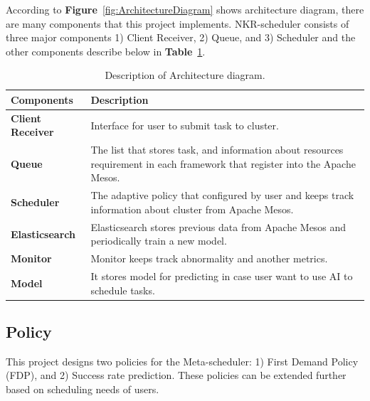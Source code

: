 \documentclass[12pt,oneside,openright,a4paper]{cpe-english-project}
\begin{document}
\hspace{10mm}According to \textbf{Figure}~\ref{fig:ArchitectureDiagram} shows architecture diagram, there are many components that this project implements. NKR-scheduler consists of three major  components 1) Client Receiver, 2) Queue, and 3) Scheduler and the other components describe below in \textbf{Table}~\ref{tbl:ArchitectureDiagramTable}.

\begin{table}[!h]
  \caption{Description of Architecture diagram.}\label{tbl:ArchitectureDiagramTable}
  \begin{tabular}{@{}|p{}|p{}|}
    \hline
    \textbf{Components} & \textbf{Description}\\
    \hline
    \textbf{Client Receiver} & Interface for user to submit task to cluster.\\
    \hline
    \textbf{Queue} & The list that stores task, and information about resources requirement in each framework that register into the Apache Mesos.\\
    \hline
    \textbf{Scheduler} & The adaptive policy that configured by user and keeps track information about cluster from Apache Mesos.\\
    \hline
    \textbf{Elasticsearch} & Elasticsearch stores previous data from Apache Mesos and periodically train a new model.\\
    \hline
    \textbf{Monitor} & Monitor keeps track abnormality and another metrics.\\
    \hline
    \textbf{Model} & It stores model for predicting in case user want to use AI to schedule tasks.\\
    \hline
  \end{tabular}
\end{table}

\subsection{Policy}  
\hspace{10mm}This project designs two policies for the Meta-scheduler: 1) First Demand Policy (FDP), and 2) Success rate prediction. These policies can be extended further based on scheduling needs of users. 
\end{document}
